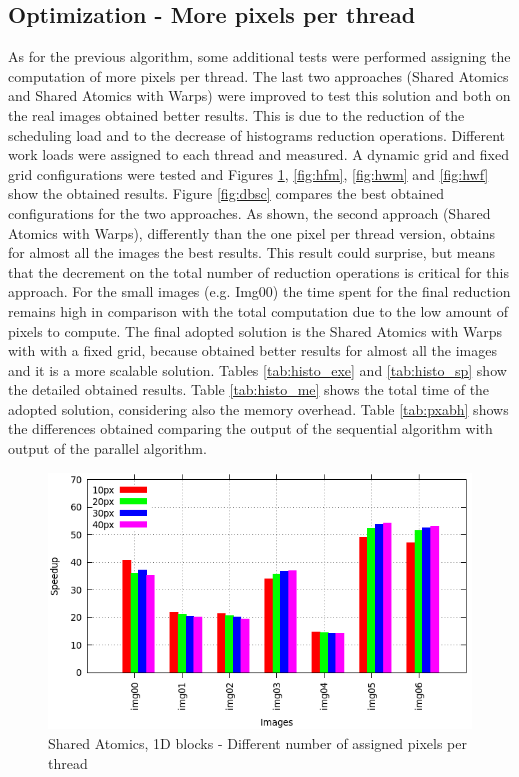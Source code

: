 \documentclass[a4paper]{article}
\begin{document}
\subsection{Optimization - More pixels per thread}
\label{sec:hop}
As for the previous algorithm, some additional tests were performed assigning the computation of more pixels per thread. The last two approaches (Shared Atomics and Shared Atomics with Warps) were improved to test this solution and both on the real images obtained better results. This is due to the reduction of the scheduling load and to the decrease of histograms reduction operations. Different work loads were assigned to each thread and measured. A dynamic grid and fixed grid configurations were tested and Figures \ref{fig:hum}, \ref{fig:hfm}, \ref{fig:hwm} and \ref{fig:hwf} show the obtained results. Figure \ref{fig:dbsc} compares the best obtained configurations for the two approaches. As shown, the second approach (Shared Atomics with Warps), differently than the one pixel per thread version, obtains for almost all the images the best results. This result could surprise, but means that the decrement on the total number of reduction operations is critical for this approach. For the small images (e.g. Img00) the time spent for the final reduction remains high in comparison with the total computation due to the low amount of pixels to compute. The final adopted solution is the Shared Atomics with Warps with with a fixed grid, because obtained better results for almost all the images and it is a more scalable solution. Tables \ref{tab:histo_exe} and \ref{tab:histo_sp} show the detailed obtained results. Table \ref{tab:histo_me} shows the total time of the adopted solution, considering also the memory overhead. Table \ref{tab:pxabh} shows the differences obtained comparing the output of the sequential algorithm with output of the parallel algorithm.


\begin{figure}[!ht]
    \centering
    \includegraphics[width=0.65\linewidth]{res/new/histogram_uni_more}
    \caption{Shared Atomics, 1D blocks - Different number of assigned pixels per thread}
    \label{fig:hum}
\end{figure}
\FloatBarrier
\end{document}
